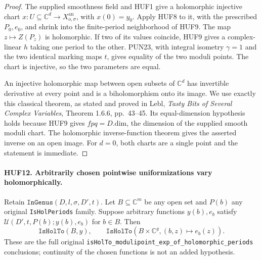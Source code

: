 \begin{proof}
The supplied smoothness field and HUF1 give a
holomorphic injective chart \(x:U\subseteq\mathbb C^d
\to X_{o,\sigma}^{\mathrm{an}}\), with \(x(0)=y_0\).
Apply HUF8 to it, with the prescribed \(P_0,e_0\),
and shrink into the finite-period neighborhood of
HUF9.  The map \(z\mapsto Z(P_z)\) is holomorphic.
If two of its values coincide, HUF9 gives a
complex-linear \(h\) taking one period to the other.
PUN23, with integral isometry \(\gamma=1\) and
the two identical marking maps \(t\), gives equality
of the two moduli points.  The chart is injective,
so the two parameters are equal.

An injective holomorphic map between open subsets
of \(\mathbb C^d\) has invertible derivative at
every point and is a biholomorphism onto its image.
We use exactly this classical theorem, as stated
and proved in Lebl, \emph{Tasty Bits of Several
Complex Variables}, Theorem 1.6.6, pp.\ 43--45.
Its equal-dimension hypothesis holds because
HUF9 gives \(fpq=D.\mathrm{dim}\), the dimension
of the supplied smooth moduli chart.
The holomorphic inverse-function theorem gives
the asserted inverse on an open image.
For \(d=0\), both charts are a single point
and the statement is immediate.
\end{proof}

\paragraph{HUF12. Arbitrarily chosen pointwise uniformizations vary holomorphically.}
\label{claim:HUF12}
Retain \(\texttt{InGenus}(D,l,\sigma,D',t)\).
Let \(B\subseteq\mathbb C^m\) be any open set and
\(P(b)\) any original \texttt{IsHolPeriods} family.
Suppose arbitrary functions \(y(b),e_b\) satisfy
\(\mathcal U(D',t,P(b);y(b),e_b)\) for \(b\in B\).
Then
\[
 \texttt{IsHolTo}(B,y),\qquad
 \texttt{IsHolTo}(B\times\mathbb C^g,(b,z)\mapsto e_b(z)).
 \tag{HUF.9}
\]
These are the full original
\texttt{isHolTo\_modulipoint\_exp\_of\_holomorphic\_periods}
conclusions; continuity of the chosen functions is not
an added hypothesis.

